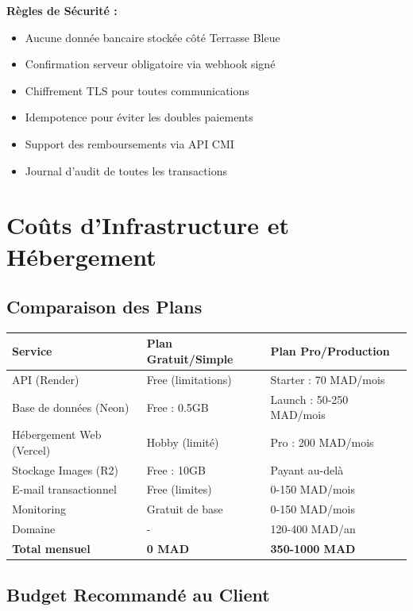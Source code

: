 \documentclass[11pt,a4paper]{article}
\begin{document}
\textbf{Règles de Sécurité :}
\begin{itemize}
    \item Aucune donnée bancaire stockée côté Terrasse Bleue
    \item Confirmation serveur obligatoire via webhook signé
    \item Chiffrement TLS pour toutes communications
    \item Idempotence pour éviter les doubles paiements
    \item Support des remboursements via API CMI
    \item Journal d'audit de toutes les transactions
\end{itemize}

\section{Coûts d'Infrastructure et Hébergement}

\subsection{Comparaison des Plans}

\begin{longtable}{|p{4cm}|p{4cm}|p{4cm}|}
\hline
\textbf{Service} & \textbf{Plan Gratuit/Simple} & \textbf{Plan Pro/Production} \\
\hline
API (Render) & Free (limitations) & Starter : 70 MAD/mois \\
\hline
Base de données (Neon) & Free : 0.5GB & Launch : 50-250 MAD/mois \\
\hline
Hébergement Web (Vercel) & Hobby (limité) & Pro : 200 MAD/mois \\
\hline
Stockage Images (R2) & Free : 10GB & Payant au-delà \\
\hline
E-mail transactionnel & Free (limites) & 0-150 MAD/mois \\
\hline
Monitoring & Gratuit de base & 0-150 MAD/mois \\
\hline
Domaine & - & 120-400 MAD/an \\
\hline
\textbf{Total mensuel} & \textbf{0 MAD} & \textbf{350-1000 MAD} \\
\hline
\end{longtable}

\subsection{Budget Recommandé au Client}
\end{document}
